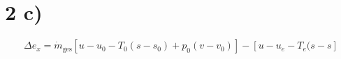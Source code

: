 \section*{2 c)}
\begin{equation*}
\Delta e_x = \dot{m}_{\text{ges}} \left[ u - u_0 - T_0 (s - s_0) + p_0 (v - v_0) \right] - \left[ u - u_e - T_e (s - s \right]
\end{equation*}